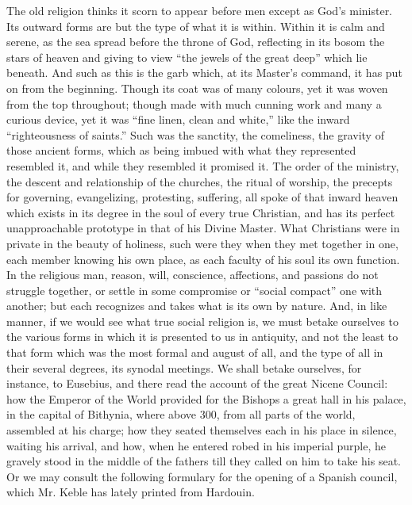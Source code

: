 The old
religion thinks it scorn to appear before men except as God's
minister. Its outward forms are but the type of what it is within.
Within it is calm and serene, as the sea spread before the throne of
God, reflecting in its bosom the stars of heaven and giving to view ``the jewels of the great deep'' which lie beneath. And such as this
is the garb which, at its Master's command, it has put on from the
beginning. Though its coat was of many colours, yet it was woven from
the top throughout; though made with much cunning work and many a
curious device, yet it was ``fine linen, clean and white,'' like the
inward ``righteousness of saints.'' Such was the sanctity, the
comeliness, the gravity of those ancient forms, which as being imbued
with what they represented resembled it, and while they resembled it
promised it. The order of the ministry, the descent and relationship of
the churches, the ritual of worship, the precepts for governing,
evangelizing, protesting, suffering, all spoke of that inward heaven
which exists in its degree in the soul of every true Christian, and has
its perfect unapproachable prototype in that of his Divine Master. What
Christians were in private in the beauty of holiness, such were they
when they met together in one, each member knowing his own place, as
each faculty of his soul its own function. In the religious man, reason,
will, conscience, affections, and passions do not struggle together, or
settle in some compromise or ``social compact'' one with another; but
each recognizes and takes what is its own by nature. And, in like
manner, if we would see what true social religion is, we must betake
ourselves to the various forms in which it is presented to us in
antiquity, and not the least to that form which was the most formal and
august of all, and the type of all in their several degrees, its synodal
meetings. We shall betake ourselves, for instance, to Eusebius, and
there read the account of the great Nicene Council: how the Emperor of
the World provided for the Bishops a great hall in his palace, in the
capital of Bithynia, where above 300, from all parts of the world,
assembled at his charge; how they seated themselves each in his place in
silence, waiting his arrival, and how, when he entered robed in his
imperial purple, he gravely stood in the middle of the fathers till they
called on him to take his seat. Or we may consult the following
formulary for the opening of a Spanish council, which Mr. Keble has
lately printed from Hardouin.

